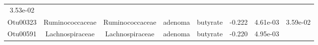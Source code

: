 \documentclass[11pt,]{article}
\begin{document}
\begin{longtable}[]{@{}cccccccc@{}}
\begin{minipage}[t]{0.08\columnwidth}
3.53e-02\strut
\end{minipage}\tabularnewline
\begin{minipage}[t]{0.08\columnwidth}\centering\strut
Otu00323\strut
\end{minipage} & \begin{minipage}[t]{0.15\columnwidth}\centering\strut
Ruminococcaceae\strut
\end{minipage} & \begin{minipage}[t]{0.15\columnwidth}\centering\strut
Ruminococcaceae\strut
\end{minipage} & \begin{minipage}[t]{0.08\columnwidth}\centering\strut
adenoma\strut
\end{minipage} & \begin{minipage}[t]{0.09\columnwidth}\centering\strut
butyrate\strut
\end{minipage} & \begin{minipage}[t]{0.07\columnwidth}\centering\strut
-0.222\strut
\end{minipage} & \begin{minipage}[t]{0.08\columnwidth}\centering\strut
4.61e-03\strut
\end{minipage} & \begin{minipage}[t]{0.08\columnwidth}\centering\strut
3.59e-02\strut
\end{minipage}\tabularnewline
\begin{minipage}[t]{0.08\columnwidth}\centering\strut
Otu00591\strut
\end{minipage} & \begin{minipage}[t]{0.15\columnwidth}\centering\strut
Lachnospiraceae\strut
\end{minipage} & \begin{minipage}[t]{0.15\columnwidth}\centering\strut
Lachnospiraceae\strut
\end{minipage} & \begin{minipage}[t]{0.08\columnwidth}\centering\strut
adenoma\strut
\end{minipage} & \begin{minipage}[t]{0.09\columnwidth}\centering\strut
butyrate\strut
\end{minipage} & \begin{minipage}[t]{0.07\columnwidth}\centering\strut
-0.220\strut
\end{minipage} & \begin{minipage}[t]{0.08\columnwidth}\centering\strut
4.95e-03\strut
\end{minipage} & \begin{minipage}[t]{0.08\columnwidth}\centering\strut

\end{minipage}
\end{longtable}
\end{document}
